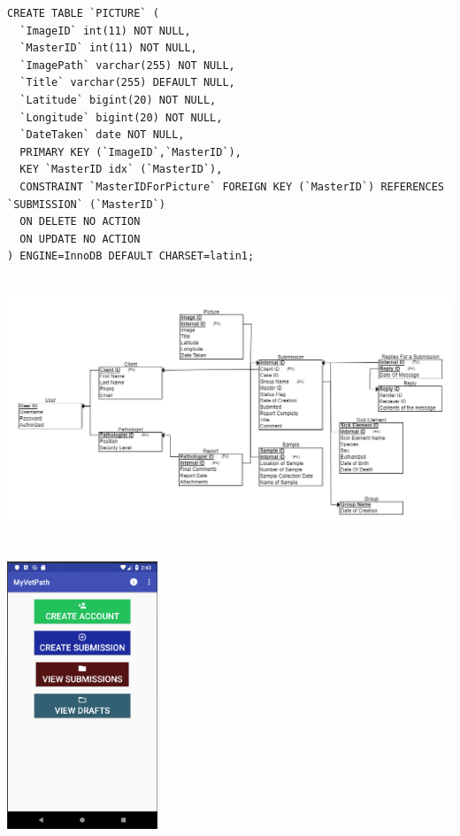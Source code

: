 \documentclass[onecolumn, draftclsnofoot,10pt, compsoc]{IEEEtran}
\begin{document}
\begin{lstlisting}
CREATE TABLE `PICTURE` (
  `ImageID` int(11) NOT NULL,
  `MasterID` int(11) NOT NULL,
  `ImagePath` varchar(255) NOT NULL,
  `Title` varchar(255) DEFAULT NULL,
  `Latitude` bigint(20) NOT NULL,
  `Longitude` bigint(20) NOT NULL,
  `DateTaken` date NOT NULL,
  PRIMARY KEY (`ImageID`,`MasterID`),
  KEY `MasterID idx` (`MasterID`),
  CONSTRAINT `MasterIDForPicture` FOREIGN KEY (`MasterID`) REFERENCES `SUBMISSION` (`MasterID`) 
  ON DELETE NO ACTION 
  ON UPDATE NO ACTION
) ENGINE=InnoDB DEFAULT CHARSET=latin1; 
\end{lstlisting}

\begin{center}
\includegraphics[height=8cm]{Beta_ERD.png}
\end{center}

\begin{center}
\includegraphics[height=8cm]{home.png}
\end{center}
\end{document}
